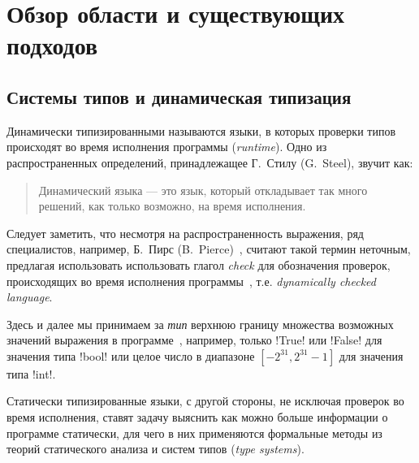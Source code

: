 \chapter{Обзор области и существующих подходов}

\section{Системы типов и динамическая типизация}

Динамически типизированными называются языки, в которых проверки типов
происходят во время исполнения программы (\emph{runtime}). Одно из
распространенных определений, принадлежащее Г.~Стилу (G.~Steel), звучит как:

\begin{quote}

  Динамический языка --- это язык, который откладывает так много решений, как
  только возможно, на время исполнения.
\end{quote}

Следует заметить, что несмотря на распространенность выражения, ряд специалистов,
например, Б.~Пирс (B.~Pierce)~\cite{Pierce2002}, считают такой термин неточным,
предлагая использовать использовать глагол \emph{check} для обозначения
проверок, происходящих во время исполнения программы~\cite{Cardelli2004}, т.е.
\emph{dynamically checked language}.


Здесь и далее мы принимаем за \emph{тип} верхнюю границу множества возможных
значений выражения в программе~\cite{Cardelli2004}, например, только !True! или
!False! для значения типа !bool! или целое число в диапазоне 
$[-2^{31}, 2^{31}-1]$ для значения типа !int!.

Статически типизированные языки, с другой стороны, не исключая проверок во время
исполнения, ставят задачу выяснить как можно больше информации о программе
статически, для чего в них применяются формальные методы из теорий статического
анализа и систем типов (\emph{type systems}). 

